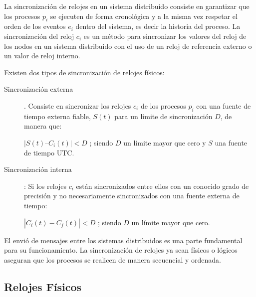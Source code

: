  
    
 La sincronización de relojes 	\cite{Czaja2018} \cite{Raptis2020} \cite{Vitillo2021}  en un sistema distribuido consiste en garantizar que los procesos  $p_{i}$ se ejecuten de forma cronológica y a la misma vez respetar el orden de los eventos $e_{i}$ dentro del sistema, es decir la historia del proceso.  La sincronización del reloj  $c_{i}$ es un método para sincronizar los valores del reloj de los nodos en un sistema distribuido con el uso de un reloj de referencia externo o un valor de reloj interno. 
	 
	
	 
	 \begin{tcolorbox}
	 	[colback=green!5!white,colframe=green!75!black,fonttitle=\bfseries, title=Tipos de sincronización de relojes físicos]
	 	Existen dos tipos de sincronización de relojes físicos:
	 	
	 	\begin{description}
	 		\item  [Sincronización externa]. Consiste en sincronizar los relojes  $c_{i}$ de los procesos  $p_{i}$ con una fuente de tiempo externa fiable, $S(t)$ para un  límite de sincronización $D$, de manera que:
	 		
	 		$	|S(t) – C_{i}(t)| < D $ ; siendo $D$ un límite mayor que cero y $S$ una fuente de tiempo UTC.
	 		
	 		\item  [Sincronización interna]: Si los relojes  $c_{i}$ están sincronizados entre ellos con un conocido grado de precisión y no necesariamente sincronizados con una fuente externa de tiempo:
	 		
	 		$|C_{i}(t) -C_{j}(t) | < D $ ; siendo $D$ un límite mayor que cero.
	 	\end{description}
	 	 
	 \end{tcolorbox}
	 
	 
	 El envió de mensajes entre los sistemas distribuidos es una parte fundamental para su funcionamiento. La sincronización de relojes ya sean físicos o lógicos aseguran que los procesos se realicen de manera secuencial y ordenada. 
	
\subsection{Relojes F\'isicos }	
 
